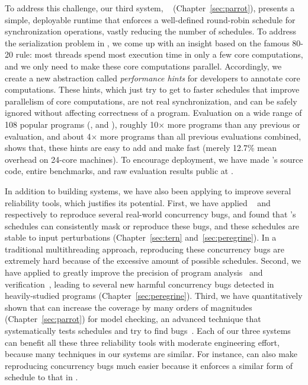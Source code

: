 To address this challenge, our third \smt system, 
\parrot~\cite{parrot:sosp13}
(Chapter~\ref{sec:parrot}), presents a simple, deployable runtime that enforces
a well-defined round-robin schedule for synchronization operations, vastly
reducing the number of schedules. To address the serialization problem in \smt,
we come up with an insight based on the famous 80-20 rule: most threads spend
most execution time in only a few core computations, and we only need to make 
these core computations parallel. Accordingly, we create a new abstraction
called \emph{performance hints} for developers to annotate core computations.
These hints, which just try to get to faster schedules that improve parallelism
of core computations, are not real synchronization, and can be safely ignored
without affecting correctness of a program. Evaluation on a wide range of 108
popular programs (\eg, \bdb and \mplayer), roughly 10$\times$ more programs than
any previous \smt or \dmt evaluation, and about 4$\times$ more programs than all
previous evaluations combined, shows that, these hints are easy to add and make
\parrot fast (merely 12.7\% mean overhead on 24-core machines). To encourage 
\smt deployment, we have made \parrot's source code, entire benchmarks, and raw
evaluation results public at \github.

In addition to building \smt systems, we have also been applying \smt to 
improve several reliability tools, which justifies its potential. First, we 
have applied \tern~\cite{cui:tern:osdi10} and 
\peregrine~\cite{peregrine:sosp11} respectively to reproduce several real-world 
concurrency bugs, and found that \smt's schedules can consistently mask or 
reproduce these bugs, and these schedules are stable to input perturbations 
(Chapter~\ref{sec:tern} and~\ref{sec:peregrine}). In a traditional 
multithreading approach, reproducing these concurrency bugs are 
extremely hard because of the excessive amount of possible schedules. Second, 
we have applied \peregrine to greatly improve the precision of program 
analysis~\cite{wu:pldi12} and verification~\cite{wu:pldi12}, leading to several 
new harmful concurrency bugs detected in heavily-studied programs 
(Chapter~\ref{sec:peregrine}). Third, we have quantitatively shown that \parrot 
can increase the coverage by many orders of magnitudes 
(Chapter~\ref{sec:parrot}) for model checking, an advanced technique that 
systematically tests schedules and try to find bugs~\cite{parrot:sosp13, 
dbug:spin11, modist:nsdi09}. Each of our three \smt systems can benefit all 
these three reliability tools with moderate engineering effort, because many 
techniques in our \smt systems are similar. For instance, \parrot can also make 
reproducing concurrency bugs much easier because it enforces a similar form of 
schedule to that in \tern.


